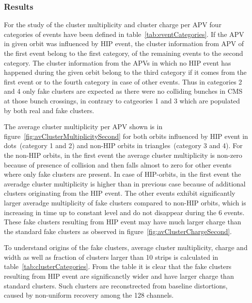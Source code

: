
\subsubsection{Results}

For the study of the cluster multiplicity and cluster charge per APV four categories of events have been defined in table~\ref{tab:eventCategories}. If the APV in given orbit was influenced by HIP event, the cluster information from APV of the first event belong to the first category, of the remaining events to the second category. The cluster information from the APVs in which no HIP event has happened during the given orbit belong to the third category if it comes from the first event or to the fourth category in case of other events. Thus in categories 2 and 4 only fake clusters are expected as there were no colliding bunches in CMS at those bunch crossings, in contrary to catgeories 1 and 3 which are populated by both real and fake clusters.

The average cluster multiplicity per APV shown is in figure~\ref{fig:avClusterMultiplicitySecond} for both orbits influenced by HIP event in dots~(category 1 and 2) and non-HIP orbits in triangles~(category 3 and 4). For the non-HIP orbits, in the first event the average cluster multiplicity is non-zero because of presence of collision and then falls almost to zero for other events where only fake clusters are present. In case of HIP-orbits, in the first event the averadge cluster multiplicity is higher than in previous case because of additional clusters originating from the HIP event. The other events exhibit significantly larger averadge multiplicity of fake clusters compared to non-HIP orbits, which is increasing in time up to constant level and do not disappear during the 6 events. These fake clusters resulting from HIP event may have much larger charge than the standard fake clusters as observed in figure~\ref{fig:avClusterChargeSecond}. 

To understand origins of the fake clusters, average cluster multiplicity, charge and width as well as fraction of clusters larger than 10 strips is calculated in table~\ref{tab:clusterCategories}. From the table it is clear that the fake clusters resulting from HIP event are significanctly wider and have larger charge than standard clusters. Such clusters are reconstrected from baseline distortions, caused by non-uniform recovery among the 128 channels.


